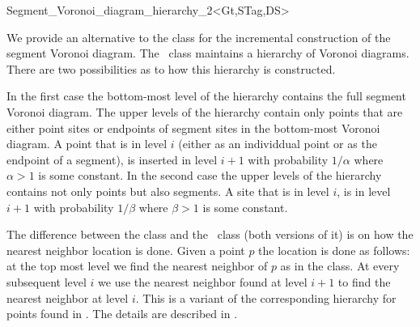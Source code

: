 


\begin{ccRefClass}{Segment_Voronoi_diagram_hierarchy_2<Gt,STag,DS>}

\ccDefinition

We provide an alternative to the class
 for the incremental
construction of the segment Voronoi diagram. The \ccRefName\ class
maintains a hierarchy of Voronoi diagrams. There are two possibilities
as to how this hierarchy is constructed.

In the first case the bottom-most level of the hierarchy contains the
full segment Voronoi diagram. The upper levels of the hierarchy
contain only points that are either point sites or endpoints of
segment sites in the bottom-most Voronoi diagram. 
A point that is in level $i$ (either as an individdual point or as the
endpoint of a segment), is inserted in level $i+1$ with probability
$1/\alpha$ where $\alpha>1$ is some constant.
In the second case the upper levels of the hierarchy contains not only
points but also segments. A site that is in level $i$, is in level
$i+1$ with probability $1/\beta$ where $\beta > 1$ is some constant.

The difference between the 
class and the \ccRefName\ class (both versions of it) is on how the
nearest neighbor location is done. Given a point $p$ the location is
done as follows: at the top most level we find the nearest neighbor of
$p$ as in the  class. At
every subsequent level $i$ we use the nearest neighbor found at level
$i+1$ to find the nearest neighbor at level $i$. This is a variant of
the corresponding hierarchy for points found in \cite{cgal:d-dh-02}. The
details are described in \cite{cgal:k-reisv-04}.


\end{ccRefClass}
